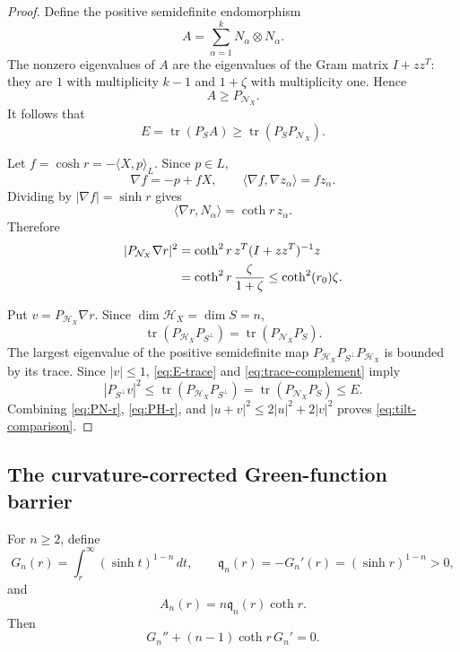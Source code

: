 \documentclass[11pt,reqno]{amsart}
\numberwithin{equation}{section}
\theoremstyle{definition}
\theoremstyle{remark}
\newcommand{\tr}{\operatorname{tr}}
\begin{document}
\begin{proof}
Define the positive semidefinite endomorphism
\[
 A=\sum_{\alpha=1}^kN_\alpha\otimes N_\alpha.
\]
The nonzero eigenvalues of $A$ are the eigenvalues of the Gram matrix
$I+zz^T$: they are $1$ with multiplicity $k-1$ and $1+\zeta$ with
multiplicity one.  Hence
\begin{equation}\label{eq:A-PN}
 A\ge P_{\mathcal N_X}.
\end{equation}
It follows that
\begin{equation}\label{eq:E-trace}
 E=\tr(P_SA)\ge\tr(P_SP_{\mathcal N_X}).
\end{equation}

Let $f=\cosh r=-\langle X,p\rangle_L$.  Since $p\in L$,
\[
 \nabla f=-p+fX,
 \qquad
 \langle\nabla f,\nabla z_\alpha\rangle=fz_\alpha.
\]
Dividing by $|\nabla f|=\sinh r$ gives
\begin{equation}\label{eq:r-Nalpha}
 \langle\nabla r,N_\alpha\rangle=\coth r\,z_\alpha.
\end{equation}
Therefore
\begin{align}
 |P_{\mathcal N_X}\nabla r|^2
 &=\coth^2r\,z^T(I+zz^T)^{-1}z \notag\\
 &=\coth^2r\,\frac{\zeta}{1+\zeta}
 \le\coth^2(r_0)\zeta. \label{eq:PN-r}
\end{align}

Put $v=P_{\mathcal H_X}\nabla r$.  Since $\dim\mathcal H_X=\dim S=n$,
\begin{equation}\label{eq:trace-complement}
 \tr(P_{\mathcal H_X}P_{S^\perp})
 =\tr(P_{\mathcal N_X}P_S).
\end{equation}
The largest eigenvalue of the positive semidefinite map
$P_{\mathcal H_X}P_{S^\perp}P_{\mathcal H_X}$ is bounded by its trace.
Since $|v|\le1$, \eqref{eq:E-trace} and
\eqref{eq:trace-complement} imply
\begin{equation}\label{eq:PH-r}
 |P_{S^\perp}v|^2
 \le\tr(P_{\mathcal H_X}P_{S^\perp})
 =\tr(P_{\mathcal N_X}P_S)
 \le E.
\end{equation}
Combining \eqref{eq:PN-r}, \eqref{eq:PH-r}, and
$|u+v|^2\le2|u|^2+2|v|^2$ proves \eqref{eq:tilt-comparison}.
\end{proof}

\subsection{The curvature-corrected Green-function barrier}\label{sec:barrier}

For $n\ge2$, define
\begin{equation}\label{eq:G-def}
 G_n(r)=\int_r^\infty(\sinh t)^{1-n}\,dt,
 \qquad
 \mathfrak q_n(r)=-G_n'(r)=(\sinh r)^{1-n}>0,
\end{equation}
and
\begin{equation}\label{eq:A-n}
 A_n(r)=n\mathfrak q_n(r)\coth r.
\end{equation}
Then
\begin{equation}\label{eq:G-ode}
 G_n''+(n-1)\coth r\,G_n'=0.
\end{equation}
\end{document}
